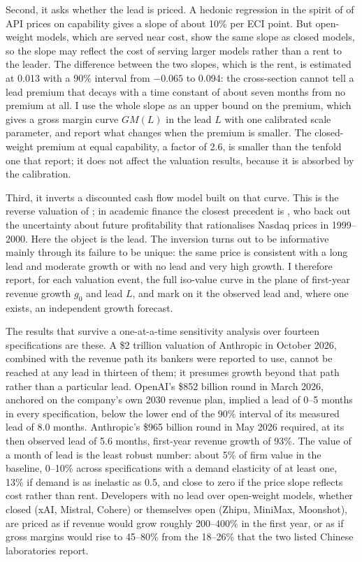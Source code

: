 \documentclass[12pt]{article}
\begin{document}
Second, it asks whether the lead is priced. A hedonic regression in the spirit of \citet{rosen1974hedonic} of API prices on capability gives a slope of about 10\% per ECI point. But open-weight models, which are served near cost, show the same slope as closed models, so the slope may reflect the cost of serving larger models rather than a rent to the leader. The difference between the two slopes, which is the rent, is estimated at 0.013 with a 90\% interval from $-0.065$ to 0.094: the cross-section cannot tell a lead premium that decays with a time constant of about seven months from no premium at all. I use the whole slope as an upper bound on the premium, which gives a gross margin curve $GM(L)$ in the lead $L$ with one calibrated scale parameter, and report what changes when the premium is smaller. The closed-weight premium at equal capability, a factor of 2.6, is smaller than the tenfold one that \citet{demirer2025market} report; it does not affect the valuation results, because it is absorbed by the calibration.

Third, it inverts a discounted cash flow model built on that curve. This is the reverse valuation of \citet{mauboussin1997cap}; in academic finance the closest precedent is \citet{pastor2006nasdaq}, who back out the uncertainty about future profitability that rationalises Nasdaq prices in 1999--2000. Here the object is the lead. The inversion turns out to be informative mainly through its failure to be unique: the same price is consistent with a long lead and moderate growth or with no lead and very high growth. I therefore report, for each valuation event, the full iso-value curve in the plane of first-year revenue growth $g_0$ and lead $L$, and mark on it the observed lead and, where one exists, an independent growth forecast.

The results that survive a one-at-a-time sensitivity analysis over fourteen specifications are these. A \$2 trillion valuation of Anthropic in October 2026, combined with the revenue path its bankers were reported to use, cannot be reached at any lead in thirteen of them; it presumes growth beyond that path rather than a particular lead. OpenAI's \$852 billion round in March 2026, anchored on the company's own 2030 revenue plan, implied a lead of 0--5 months in every specification, below the lower end of the 90\% interval of its measured lead of 8.0 months. Anthropic's \$965 billion round in May 2026 required, at its then observed lead of 5.6 months, first-year revenue growth of 93\%. The value of a month of lead is the least robust number: about 5\% of firm value in the baseline, 0--10\% across specifications with a demand elasticity of at least one, 13\% if demand is as inelastic as 0.5, and close to zero if the price slope reflects cost rather than rent. Developers with no lead over open-weight models, whether closed (xAI, Mistral, Cohere) or themselves open (Zhipu, MiniMax, Moonshot), are priced as if revenue would grow roughly 200--400\% in the first year, or as if gross margins would rise to 45--80\% from the 18--26\% that the two listed Chinese laboratories report.
\end{document}
